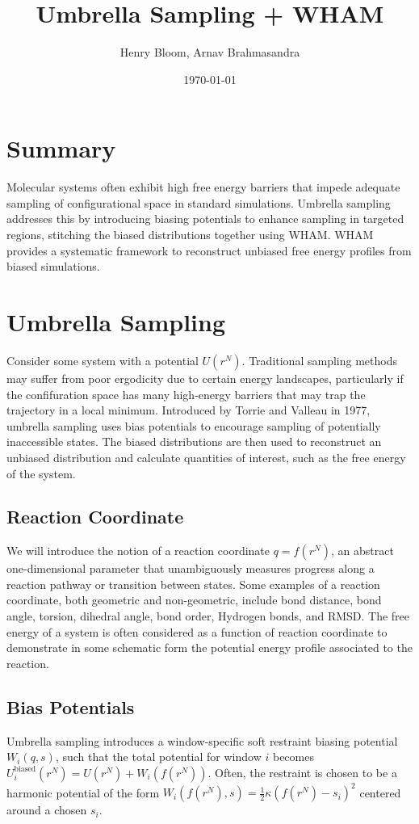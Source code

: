 \documentclass{article}
\title{Umbrella Sampling + WHAM}
\author{Henry Bloom, Arnav Brahmasandra}
\date{\today}
\begin{document}
\maketitle

\section{Summary}
Molecular systems often exhibit high free energy barriers that impede adequate sampling of configurational space in standard simulations. 
Umbrella sampling addresses this by introducing biasing potentials to enhance sampling in targeted regions, stitching the biased distributions together using WHAM.
WHAM provides a systematic framework to reconstruct unbiased free energy profiles from biased simulations. 

\section{Umbrella Sampling}
Consider some system with a potential $U(r^N)$. 
Traditional sampling methods may suffer from poor ergodicity due to certain energy landscapes, particularly if the confifuration space has many high-energy barriers that may trap the trajectory in a local minimum.
Introduced by Torrie and Valleau in 1977, umbrella sampling uses bias potentials to encourage sampling of potentially inaccessible states.
The biased distributions are then used to reconstruct an unbiased distribution and calculate quantities of interest, such as the free energy of the system.

\subsection{Reaction Coordinate}
We will introduce the notion of a reaction coordinate $q = f(r^N)$, an abstract one-dimensional parameter that unambiguously measures progress along a reaction pathway or transition between states.
Some examples of a reaction coordinate, both geometric and non-geometric, include bond distance, bond angle, torsion, dihedral angle, bond order, Hydrogen bonds, and RMSD. 
The free energy of a system is often considered as a function of reaction coordinate to demonstrate in some schematic form the potential energy profile associated to the reaction.

\subsection{Bias Potentials}
Umbrella sampling introduces a window-specific soft restraint biasing potential $W_i(q, s)$, such that the total potential for window $i$ becomes $U_i^\text{biased}(r^N) = U(r^N) + W_i(f(r^N))$.
Often, the restraint is chosen to be a harmonic potential of the form $W_i(f(r^N),s) = \frac{1}{2} \kappa (f(r^N) - s_i)^2$ centered around a chosen $s_i$.
\end{document}
